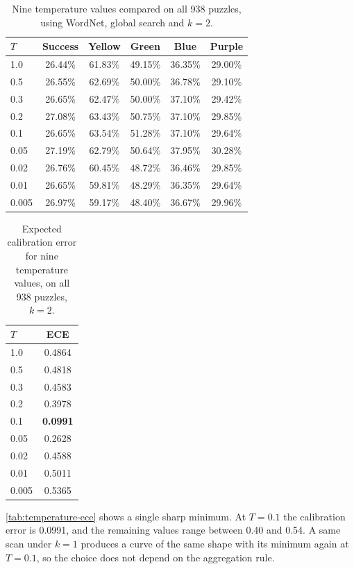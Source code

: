 \begin{table}[t]
\centering
\caption{Nine temperature values compared on all 938 puzzles, using WordNet, global search and $k = 2$.}
\label{tab:temperature-results}
\begin{tabular}{lccccc}
\toprule
$T$ & Success & Yellow & Green & Blue & Purple \\
\midrule
1.0 & 26.44\% & 61.83\% & 49.15\% & 36.35\% & 29.00\% \\
0.5 & 26.55\% & 62.69\% & 50.00\% & 36.78\% & 29.10\% \\
0.3 & 26.65\% & 62.47\% & 50.00\% & 37.10\% & 29.42\% \\
0.2 & 27.08\% & 63.43\% & 50.75\% & 37.10\% & 29.85\% \\
0.1 & 26.65\% & 63.54\% & 51.28\% & 37.10\% & 29.64\% \\
0.05 & 27.19\% & 62.79\% & 50.64\% & 37.95\% & 30.28\% \\
0.02 & 26.76\% & 60.45\% & 48.72\% & 36.46\% & 29.85\% \\
0.01 & 26.65\% & 59.81\% & 48.29\% & 36.35\% & 29.64\% \\
0.005 & 26.97\% & 59.17\% & 48.40\% & 36.67\% & 29.96\% \\
\bottomrule
\end{tabular}
\end{table}

\begin{table}[t]
\centering
\caption{Expected calibration error for nine temperature values, on all 938 puzzles, $k = 2$.}
\label{tab:temperature-ece}
\begin{tabular}{lc}
\toprule
$T$ & ECE \\
\midrule
1.0 & 0.4864 \\
0.5 & 0.4818 \\
0.3 & 0.4583 \\
0.2 & 0.3978 \\
0.1 & \textbf{0.0991} \\
0.05 & 0.2628 \\
0.02 & 0.4588 \\
0.01 & 0.5011 \\
0.005 & 0.5365 \\
\bottomrule
\end{tabular}
\end{table}

\autoref{tab:temperature-ece} shows a single sharp minimum. At $T = 0.1$ the calibration error is 0.0991, and the remaining values range between 0.40 and 0.54. A same scan under $k = 1$ produces a curve of the same shape with its minimum again at $T = 0.1$, so the choice does not depend on the aggregation rule.

